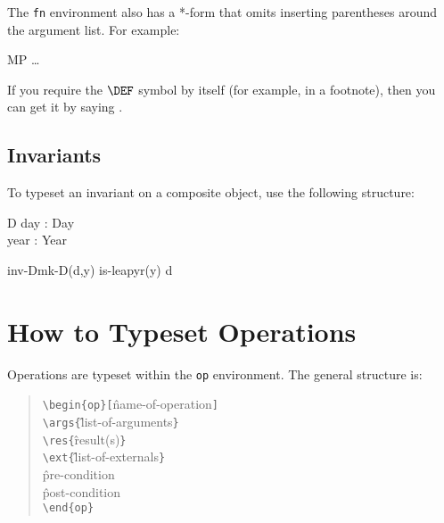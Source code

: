 {The {\tt fn} environment also has a *-form that omits inserting
parentheses around the argument list.  For example:


\begin{leftside}
\begin{fn*}{MP}{\rho\sigma}
\ldots
\end{fn*}
\end{leftside}

If you require the $\DEF$ symbol by itself (for example, in a
footnote), then you can get it by saying \cs\DEF.

\subsection*{Invariants}

To typeset an invariant on a composite object, use the following
structure:

\begin{leftside}
\begin{record}{D}
  day : Day \\
  year : Year
\end{record}
\where
\begin{fn}{inv-D}{mk-D(d,y)}
  is-leapyr(y) \Or d 
\end{fn}
\end{leftside}


\section*{How to Typeset Operations}

Operations are typeset within the {\tt op\/} environment.
The general structure is:

\begin{verse}
\verb;\begin{op}[;\^{name-of-operation}\verb;]; \\
\verb;\args{;\^{list-of-arguments}\verb;}; \\
\verb;\res{;\^{result(s)}\verb;}; \\
\verb;\ext{;\^{list-of-externals}\verb;}; \\
\^{pre-condition} \\
\^{post-condition} \\
\verb;\end{op};
\end{verse}

}
